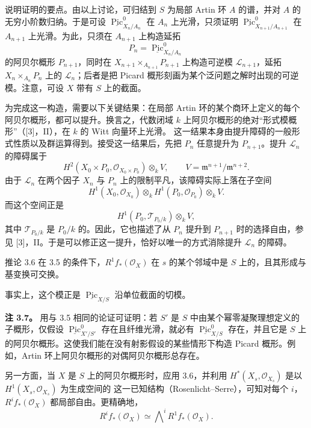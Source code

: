 说明证明的要点。由以上讨论，可归结到 $S$ 为局部 Artin 环 $A$ 的谱，并对 $A$ 的无穷小阶数归纳。于是可设 $\underline{\operatorname{Pic}}^0_{X_n/A_n}$ 在 $A_n$ 上光滑，只须证明 $\underline{\operatorname{Pic}}^0_{X_{n+1}/A_{n+1}}$ 在 $A_{n+1}$ 上光滑。为此，只须在 $A_{n+1}$ 上构造延拓
\[
 P_n=\underline{\operatorname{Pic}}^0_{X_n/A_n}
\]
的阿贝尔概形 $P_{n+1}$，同时在 $X_{n+1}\times_{A_{n+1}}P_{n+1}$ 上构造可逆模 $\mathcal L_{n+1}$，延拓 $X_n\times_{A_n}P_n$ 上的 $\mathcal L_n$；后者是把 Picard 概形刻画为某个泛问题之解时出现的可逆模。注意，可设 $X$ 带有 $S$ 上的截面。

为完成这一构造，需要以下关键结果：在局部 Artin 环的某个商环上定义的每个阿贝尔概形，都可以提升。换言之，代数闭域 $k$ 上阿贝尔概形的绝对“形式模概形”（[3]，II），在 $k$ 的 Witt 向量环上光滑。
这一结果本身由提升障碍的一般形式性质以及群运算得到。接受这一结果后，先把 $P_n$ 任意提升为 $P_{n+1}$。提升 $\mathcal L_n$ 的障碍属于
\[
 H^2(X_0\times P_0,\mathcal O_{X_0\times P_0})\otimes_kV,
 \qquad V=\mathfrak m^{n+1}/\mathfrak m^{n+2}.
\]
由于 $\mathcal L_n$ 在两个因子 $X_n$ 与 $P_n$ 上的限制平凡，该障碍实际上落在子空间
\[
 H^1(X_0,\mathcal O_{X_0})\otimes_k
 H^1(P_0,\mathcal O_{P_0})\otimes_kV.
\]
而这个空间正是
\[
 H^1(P_0,\mathcal T_{P_0/k})\otimes_kV,
\]
其中 $\mathcal T_{P_0/k}$ 是 $P_0/k$ 的。因此，它也描述了从 $P_n$ 提升到 $P_{n+1}$ 时的选择自由，参见 [3]，II。于是可以修正这一提升，恰好以唯一的方式消除提升 $\mathcal L_n$ 的障碍。

\begin{statement}{推论 3.6}
在 3.5 的条件下，$R^1f_*(\mathcal O_X)$ 在 $s$ 的某个邻域中是 $S$ 上的，且其形成与基变换可交换。
\end{statement}
事实上，这个模正是 $\underline{\operatorname{Pic}}_{X/S}$ 沿单位截面的切模。

\textbf{注 3.7。} 用与 3.5 相同的论证可证明：若 $S'$ 是 $S$ 中由某个幂零凝聚理想定义的子概形，仅假设 $\underline{\operatorname{Pic}}^0_{X'/S'}$ 存在且纤维光滑，就必有 $\underline{\operatorname{Pic}}^0_{X/S}$ 存在，并且它是 $S$ 上的阿贝尔概形。这使我们能在没有射影假设的某些情形下构造 Picard 概形。例如，Artin 环上阿贝尔概形的对偶阿贝尔概形总存在。

另一方面，当 $X$ 是 $S$ 上的阿贝尔概形时，应用 3.6，并利用 $H^*(X_s,\mathcal O_{X_s})$ 是以 $H^1(X_s,\mathcal O_{X_s})$ 为生成空间的 这一已知结构（Rosenlicht--Serre），可知对每个 $i$，$R^if_*(\mathcal O_X)$ 都局部自由。更精确地，
\[
 R^if_*(\mathcal O_X)\simeq
 \bigwedge\nolimits^i R^1f_*(\mathcal O_X).
\]

